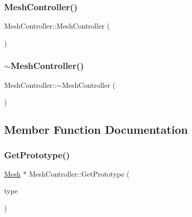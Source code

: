\subsubsection{\texorpdfstring{MeshController()}{MeshController()}}
{\footnotesize\ttfamily Mesh\+Controller\+::\+Mesh\+Controller (\begin{DoxyParamCaption}{ }\end{DoxyParamCaption})}

\mbox{\label{class_mesh_controller_a674b1738fffaaed8f77970c8ab1c70f8}} 
\subsubsection{\texorpdfstring{$\sim$MeshController()}{~MeshController()}}
{\footnotesize\ttfamily Mesh\+Controller\+::$\sim$\+Mesh\+Controller (\begin{DoxyParamCaption}{ }\end{DoxyParamCaption})}



\subsection{Member Function Documentation}
\mbox{\label{class_mesh_controller_ad0bee88b35217e415e62a7183ca148a6}} 
\subsubsection{\texorpdfstring{GetPrototype()}{GetPrototype()}}
{\footnotesize\ttfamily \mbox{\hyperlink{class_mesh}{Mesh}} $\ast$ Mesh\+Controller\+::\+Get\+Prototype (\begin{DoxyParamCaption}\item[{\mbox{\hyperlink{_abstract_factory_2_abstract_factory_2builder_2_mesh_builder_8h_ad6436347ddb93aed826a19081b53dd61}{M\+E\+S\+H\+T\+Y\+PE}}}]{type }\end{DoxyParamCaption})}

\mbox{\label{class_mesh_controller_a7ea29b746017730e12c78dd8ca62e7e6}} 
